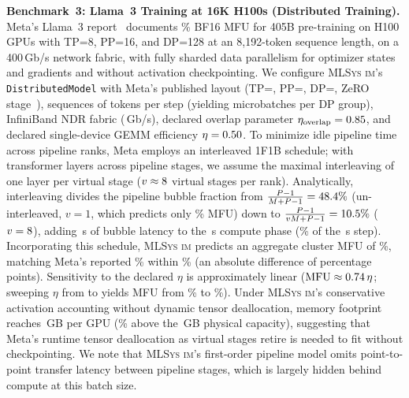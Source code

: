 \documentclass[10pt,twocolumn]{article}
\newcommand{\mlsysim}{\mbox{\textsc{MLSys}\,\textperiodcentered\,\textsc{im}}\xspace}
\begin{document}
\textbf{Benchmark~3: Llama~3 Training at 16K H100s (Distributed Training).}
Meta's Llama~3 report~\citep{llama3team2024} documents \AnchorThreeReportedMfuPct\% BF16 MFU for 405B pre-training on \AnchorThreeGpus{} H100 GPUs with TP=8, PP=16, and DP=128 at an 8{,}192-token sequence length, on a 400\,Gb/s network fabric, with fully sharded data parallelism for optimizer states and gradients and without activation checkpointing. We configure \mlsysim's \texttt{DistributedModel} with Meta's published layout (TP=\AnchorThreeTp, PP=\AnchorThreePp, DP=\AnchorThreeDp, ZeRO stage~\AnchorThreeZeroStage), \AnchorThreeBatch{} sequences of \AnchorThreeSeqLen{} tokens per step (yielding \AnchorThreeMicrobatches{} microbatches per DP group), InfiniBand NDR fabric (\AnchorThreeFabricGbps\,Gb/s), declared overlap parameter $\eta_{\text{overlap}} = 0.85$, and declared single-device GEMM efficiency $\eta = 0.50$. To minimize idle pipeline time across \AnchorThreePp{} pipeline ranks, Meta employs an interleaved 1F1B schedule; with \AnchorThreeLayers{} transformer layers across \AnchorThreePp{} pipeline stages, we assume the maximal interleaving of one layer per virtual stage ($v \approx 8$ virtual stages per rank). Analytically, interleaving divides the pipeline bubble fraction from $\frac{P-1}{M+P-1} = 48.4\%$ (un-interleaved, $v=1$, which predicts only \AnchorThreeUninterleavedMfuPct\% MFU) down to $\frac{P-1}{vM+P-1} = 10.5\%$ ($v=8$), adding \AnchorThreeBubbleSeconds\,s of bubble latency to the \AnchorThreeComputeSeconds\,s compute phase (\AnchorThreeBubbleShareOfStepPct\% of the \AnchorThreeStepSeconds\,s step). Incorporating this schedule, \mlsysim predicts an aggregate cluster MFU of \AnchorThreeMfuPct\%, matching Meta's reported \AnchorThreeReportedMfuPct\% within \AnchorThreeErrorPct\% (an absolute difference of \AnchorThreeErrorPoints{} percentage points). Sensitivity to the declared $\eta$ is approximately linear ($\text{MFU} \approx 0.74\,\eta$; sweeping $\eta$ from \AnchorThreeEtaLow{} to \AnchorThreeEtaHigh{} yields MFU from \AnchorThreeMfuAtLowEtaPct\% to \AnchorThreeMfuAtHighEtaPct\%). Under \mlsysim's conservative activation accounting without dynamic tensor deallocation, memory footprint reaches \AnchorThreeMemoryGB\,GB per GPU (\AnchorThreeMemoryOverCapPct\% above the \AnchorThreeCapacityGB\,GB physical capacity), suggesting that Meta's runtime tensor deallocation as virtual stages retire is needed to fit without checkpointing. We note that \mlsysim's first-order pipeline model omits point-to-point transfer latency between pipeline stages, which is largely hidden behind compute at this batch size.
\end{document}
